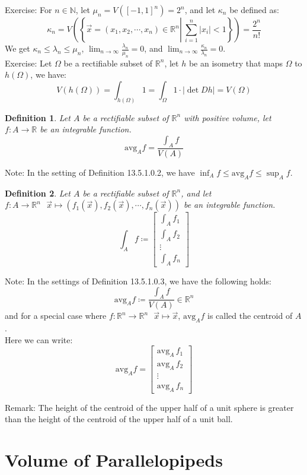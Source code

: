 \documentclass[11pt,oneside]{book}
\theoremstyle{break}
\theoremstyle{break}
\newtheorem{defn}{Definition}[corL]
\newcommand{\R}{\mathbb{R}}
\newcommand{\N}{\mathbb{N}}
\newcommand{\bmat}[1]{\begin{bmatrix} #1 \end{bmatrix}}
\newcommand{\note}{\color{red}Note: \color{black}}
\newcommand{\remark}{\color{blue}Remark: \color{black}}
\newcommand{\exercise}{\color{green}Exercise: \color{black}}
\begin{document}
\exercise
For $n \in \N$, let $\mu_n = V([-1,1]^n) = 2^n$, and let $\kappa_n$ be defined as:
$$\kappa_n = V\left(\left\{\vec{x}=(x_1,x_2,\cdots,x_n)\in \R^n \left|\  \sum_{i=1}^n|x_i| < 1 \right.\right\} \right)= \frac{2^n}{n!}$$
We get $\kappa_n \leq \lambda_n \leq \mu_n$, $\lim_{n\to \infty} \frac{\lambda_n}{\mu_n} = 0$, and $\lim_{n \to \infty} \frac{\kappa_n}{\lambda_n}= 0$. \\

\exercise Let $\Omega$ be a rectifiable subset of $\R^n$, let $h$ be an isometry that maps $\Omega$ to $h(\Omega)$, we have: $$V(h(\Omega)) = \int_{h(\Omega)} 1 = \int_{\Omega} 1\cdot |\det Dh| = V(\Omega)$$

\newpage
\begin{defn}
Let $A$ be a rectifiable subset of $\R^n$ with positive volume, let $f:A \to \R$ be an integrable function. $${\text{avg}}_A f = \frac{\int_A f}{V(A)}$$
\end{defn}
\note In the setting of Definition 13.5.1.0.2, we have $\inf_A f \leq {\text{avg}}_A f \leq \sup_A f$.\\

\begin{defn}
Let $A$ be a rectifiable subset of $\R^n$, and let $f:A\to \R^n \ \ \ \vec{x} \mapsto (f_1(\vec{x}),f_2(\vec{x}),\cdots, f_n(\vec{x}))$ be an integrable function. $$\int_A f \coloneqq \bmat{\int_A f_1 \\ \int_A f_2 \\ \vdots \\ \int_A f_n}$$
\end{defn}
\note In the settings of Definition 13.5.1.0.3, we have the following holds: 
$$\text{avg}_A f\coloneqq \frac{\int_A f}{V(A)}\in \R^n$$ 
and for a special case where $f:\R^n \to \R^n \ \ \ \vec{x}\mapsto \vec{x}$, $\text{avg}_A f$ is called the centroid of $A$. \\
Here we can write:
$$\text{avg}_A f = \bmat{\text{avg}_A \,f_1 \\ \text{avg}_A \, f_2 \\ \vdots \\ \text{avg}_A \, f_n}$$

\remark The height of the centroid of the upper half of a unit sphere is greater than the height of the centroid of the upper half of a unit ball.\\



\newpage
\section[Volume of Parallelopipeds]{\color{red} Volume of Parallelopipeds \color{black}}
\end{document}
